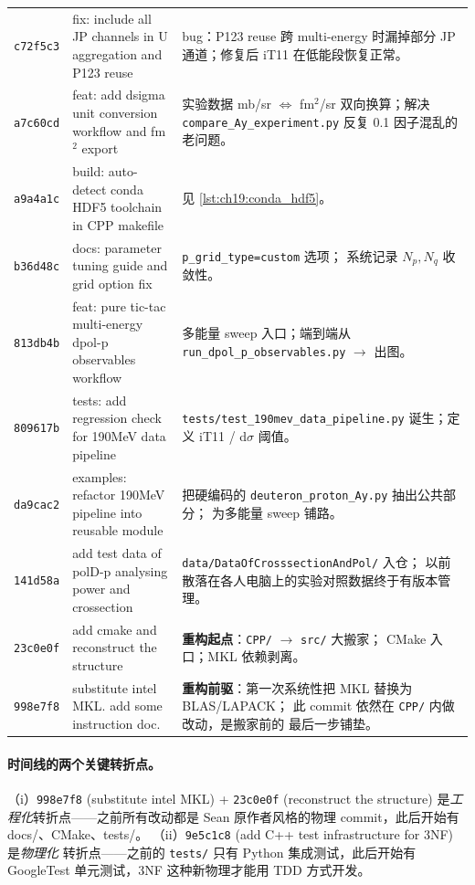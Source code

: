 \begin{longtable}{@{}p{16mm}p{52mm}p{72mm}@{}}
\texttt{c72f5c3} & fix: include all JP channels in U aggregation and P123 reuse
& bug：P123 reuse 跨 multi-energy 时漏掉部分 JP 通道；修复后
  iT11 在低能段恢复正常。\\

\texttt{a7c60cd} & feat: add dsigma unit conversion workflow and fm$^2$ export
& 实验数据 mb/sr $\Leftrightarrow$ fm$^2$/sr 双向换算；解决 \texttt{compare\_Ay\_experiment.py}
  反复 0.1 因子混乱的老问题。\\

\texttt{a9a4a1c} & build: auto-detect conda HDF5 toolchain in CPP makefile
& 见 \cref{lst:ch19:conda_hdf5}。\\

\texttt{b36d48c} & docs: parameter tuning guide and grid option fix
& \texttt{p\_grid\_type=custom} 选项；
  系统记录 $N_p, N_q$ 收敛性。\\

\texttt{813db4b} & feat: pure tic-tac multi-energy dpol-p observables workflow
& 多能量 sweep 入口；端到端从 \texttt{run\_dpol\_p\_observables.py} $\to$ 出图。\\

\texttt{809617b} & tests: add regression check for 190MeV data pipeline
& \texttt{tests/test\_190mev\_data\_pipeline.py} 诞生；定义 iT11 / d$\sigma$ 阈值。\\

\texttt{da9cac2} & examples: refactor 190MeV pipeline into reusable module
& 把硬编码的 \texttt{deuteron\_proton\_Ay.py} 抽出公共部分；
  为多能量 sweep 铺路。\\

\texttt{141d58a} & add test data of polD-p analysing power and crossection
& \texttt{data/DataOfCrosssectionAndPol/} 入仓；
  以前散落在各人电脑上的实验对照数据终于有版本管理。\\

\texttt{23c0e0f} & add cmake and reconstruct the structure
& \textbf{重构起点}：\texttt{CPP/} $\to$ \texttt{src/} 大搬家；
  CMake 入口；MKL 依赖剥离。 \\

\texttt{998e7f8} & substitute intel MKL. add some instruction doc.
& \textbf{重构前驱}：第一次系统性把 MKL 替换为 BLAS/LAPACK；
  此 commit 依然在 \texttt{CPP/} 内做改动，是搬家前的
  最后一步铺垫。\\

\end{longtable}

\paragraph{时间线的两个关键转折点。}
%
（i）\texttt{998e7f8} (substitute intel MKL) + \texttt{23c0e0f}
(reconstruct the structure) 是\emph{工程化}转折点——之前所有改动都是 Sean
原作者风格的物理 commit，此后开始有 docs/、CMake、tests/。
%
（ii）\texttt{9e5c1c8} (add C++ test infrastructure for 3NF) 是\emph{物理化}
转折点——之前的 \texttt{tests/} 只有 Python 集成测试，此后开始有 GoogleTest
单元测试，3NF 这种新物理才能用 TDD 方式开发。

